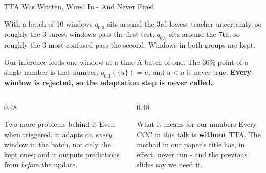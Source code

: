 \documentclass[aspectratio=169]{beamer}
\newcommand{\hl}[1]{\textcolor{coolpurple}{\textbf{#1}}}
\begin{document}
	\begin{frame}{TTA Was Written, Wired In - And Never Fired}
		\begin{block}{With a batch of 10 windows}
			\small
			$q_{0.3}$ sits around the 3rd-lowest teacher uncertainty, so roughly the 3 surest windows
			pass the first test; $q_{0.7}$ sits around the 7th, so roughly the 3 most confused pass
			the second. Windows in both groups are kept.
		\end{block}
		\begin{alertblock}{Our inference feeds one window at a time}
			\small
			A batch of one. The 30\% point of a single number is that number,
			$q_{0.3}(\{u\}) = u$, and $u < u$ is never true.
			\hl{Every window is rejected, so the adaptation step is never called.}
		\end{alertblock}
		\begin{columns}[onlytextwidth]
			\begin{column}{0.48\textwidth}
				\begin{alertblock}{Two more problems behind it}
					\small
					Even when triggered, it adapts on \emph{every} window in the batch, not only
					the kept ones; and it outputs predictions from \emph{before} the update.
				\end{alertblock}
			\end{column}
			\begin{column}{0.48\textwidth}
				\begin{block}{What it means for our numbers}
					\small
					Every CCC in this talk is \textbf{without} TTA. The method in our paper's
					title has, in effect, never run - and the previous slides say we need it.
				\end{block}
			\end{column}
		\end{columns}
	\end{frame}
\end{document}
